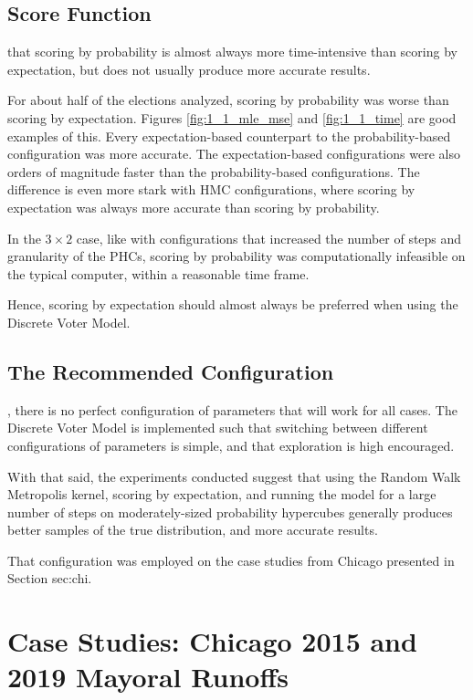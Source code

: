 \subsection{Score Function}

 that scoring by probability is almost always more time-intensive than scoring by expectation, but does not usually produce more accurate results.

For about half of the elections analyzed, scoring by probability was worse than scoring by expectation. Figures \ref{fig:1_1_mle_mse} and \ref{fig:1_1_time} are good examples of this. Every expectation-based counterpart to the probability-based configuration was more accurate. The expectation-based configurations were also orders of magnitude faster than the probability-based configurations. The difference is even more stark with HMC configurations, where scoring by expectation was always more accurate than scoring by probability.

In the $3 \times 2$ case, like with configurations that increased the number of steps and granularity of the PHCs, scoring by probability was computationally infeasible on the typical computer, within a reasonable time frame.

Hence, scoring by expectation should almost always be preferred when using the Discrete Voter Model.


\subsection{The Recommended Configuration}

, there is no perfect configuration of parameters that will work for all cases. The Discrete Voter Model is implemented such that switching between different configurations of parameters is simple, and that exploration is high encouraged.

With that said, the experiments conducted suggest that using the Random Walk Metropolis kernel, scoring by expectation, and running the model for a large number of steps on moderately-sized probability hypercubes generally produces better samples of the true distribution, and more accurate results.

That configuration was employed on the case studies from Chicago presented in Section {sec:chi}.


\section{Case Studies: Chicago 2015 and 2019 Mayoral Runoffs}
\label{sec:chicago}

